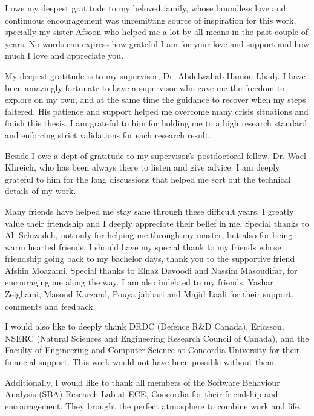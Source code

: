 I owe my deepest gratitude to my beloved family, whose
boundless love and continuous encouragement was unremitting source of inspiration
for this work, specially my sister Afsoon who helped me a lot by all means in the past couple of years.  No words can express how grateful I am for your love and support and
how much I love and appreciate you.

My deepest gratitude is to my supervisor, Dr. Abdelwahab Hamou-Lhadj. I have been amazingly fortunate to have a supervisor who gave me the freedom to explore on my own, and at the same time the guidance to recover when my steps faltered. His patience and support helped me overcome many crisis situations and finish this thesis. I am grateful to him for holding me to a high research standard and enforcing strict validations for each research result.

Beside I owe a dept of gratitude to my supervisor's postdoctoral fellow, Dr. Wael Khreich, who has been always there to listen and give advice. I am deeply grateful to him for the long discussions that helped me sort out the technical details of my work. 

Many friends have helped me stay sane through these difficult years. I greatly value their friendship and I deeply appreciate their belief in me. Special thanks to Ali Sehizadeh, not only for helping me through my master, but also for being warm hearted friends. I should have my special thank to my friends whose friendship going back to my bachelor days, thank you to the supportive friend Afshin Moazami.
Special thanks to Elnaz Davoodi and Nassim Masoudifar, for encouraging me along the way.
I am also indebted to my friends, Yashar Zeighami, Masoud Karzand, Pouya jabbari and Majid Laali for their support, comments and feedback.

I would also like to deeply thank DRDC (Defence R\&D Canada), Ericsson, NSERC (Natural Sciences and Engineering Research Council of Canada), and the Faculty of Engineering and Computer Science at Concordia University for their financial support. This work would not have been possible without them.

Additionally, I would like to thank all members of the Software Behaviour Analysis (SBA) Research Lab at ECE, Concordia for their friendship and encouragement. They brought the perfect atmosphere to combine work and life.

